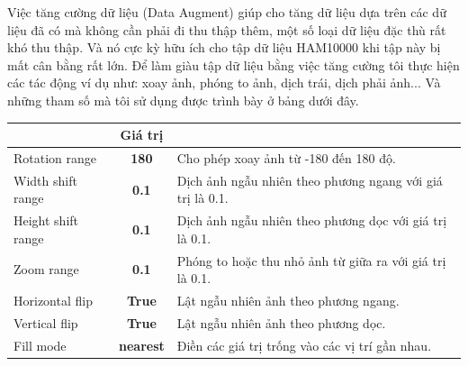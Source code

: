 \documentclass[12pt,a4paper]{article}
\begin{document}
	\noindent
	Việc tăng cường dữ liệu (Data Augment) giúp cho tăng dữ liệu dựa trên các dữ liệu đã có mà không cần phải đi thu thập thêm, một số loại dữ liệu đặc thù rất khó thu thập. Và nó cực kỳ hữu ích cho tập dữ liệu HAM10000 khi tập này bị mất cân bằng rất lớn. Để làm giàu tập dữ liệu bằng việc tăng cường tôi thực hiện các tác động ví dụ như: xoay ảnh, phóng to ảnh, dịch trái, dịch phải ảnh... Và những tham số mà tôi sử dụng được trình bày ở bảng dưới đây.
	
	\begin{center}
		\begin{tabular}{|l|c|l|}
			\hline
			\rowcolor[HTML]{000000} 
			\multicolumn{1}{|c|}{\cellcolor[HTML]{000000}{\color[HTML]{FFFFFF} \textbf{Tham số}}} & {\color[HTML]{FFFFFF} \textbf{Giá trị}} & \multicolumn{1}{c|}{\cellcolor[HTML]{000000}{\color[HTML]{FFFFFF} \textbf{Mô tả}}} \\ \hline
			Rotation range                                                                        & \textbf{180}                            & Cho phép xoay ảnh từ -180 đến 180 độ.                                              \\ \hline
			Width shift range                                                                     & \textbf{0.1}                            & Dịch ảnh ngẫu nhiên theo phương ngang với giá trị là 0.1.                          \\ \hline
			Height shift range                                                                    & \textbf{0.1}                            & Dịch ảnh ngẫu nhiên theo phương dọc với giá trị là 0.1.                            \\ \hline
			Zoom range                                                                            & \textbf{0.1}                            & Phóng to hoặc thu nhỏ ảnh từ giữa ra với giá trị là 0.1.                           \\ \hline
			Horizontal flip                                                                       & \textbf{True}                           & Lật ngẫu nhiên ảnh theo phương ngang.                                              \\ \hline
			Vertical flip                                                                         & \textbf{True}                           & Lật ngẫu nhiên ảnh theo phương dọc.                                                \\ \hline
			Fill mode                                                                             & \textbf{nearest}                        & Điền các giá trị trống vào các vị trí gần nhau.                                    \\ \hline
		\end{tabular}
	\end{center}
	
\end{document}
